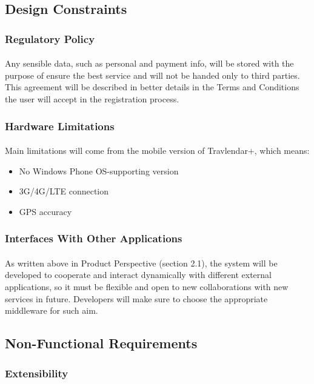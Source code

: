 \documentclass{article}
\begin{document}
\subsection{Design Constraints}
\subsubsection{Regulatory Policy}
\paragraph{}
Any sensible data, such as personal and payment info, will be stored with the purpose of ensure the best service and will not be handed only to third parties. This agreement will be described in better details in the Terms and Conditions the user will accept in the registration process.
\subsubsection{Hardware Limitations}
\paragraph{}
Main limitations will come from the mobile version of Travlendar+, which means:
\begin{itemize}
\item{} No Windows Phone OS-supporting version
\item{} 3G/4G/LTE connection
\item{} GPS accuracy
\end{itemize}
\subsubsection{Interfaces With Other Applications}
\paragraph{}
As written above in Product Perspective (section 2.1), the system will be developed to cooperate and interact dynamically with different external applications, so it must be flexible and open to new collaborations with new services in future. Developers will make sure to choose the appropriate middleware for such aim.
\subsection{Non-Functional Requirements}
\subsubsection{Extensibility}
\end{document}
